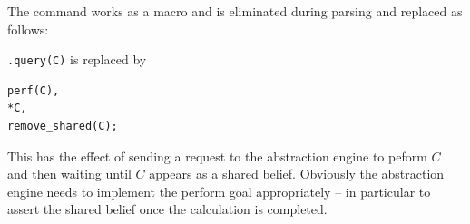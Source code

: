 \documentclass[a4]{article}
\begin{document}
The command works as a macro and is eliminated during parsing and replaced as follows:

\texttt{.query(C)} is replaced by
\begin{verbatim}
perf(C),
*C,
remove_shared(C);
\end{verbatim}
This has the effect of sending a request to the abstraction engine to peform $C$ and then waiting until $C$ appears as a shared belief.  Obviously the abstraction engine needs to implement the perform goal appropriately -- in particular to assert the shared belief once the calculation is completed.



\end{document}
